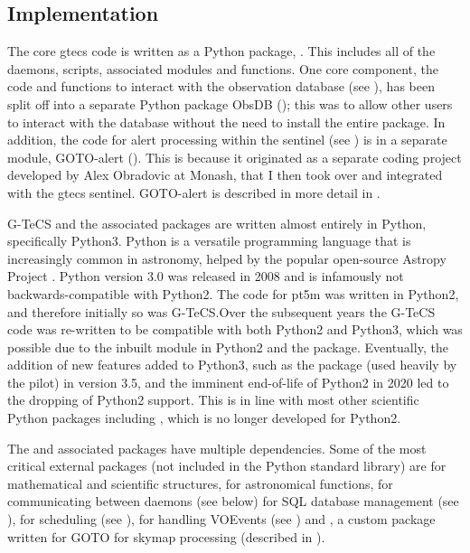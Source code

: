 \begin{colsection}
\begin{colsection}
\end{colsection}


\subsection{Implementation}
\label{sec:implementation}
\begin{colsection}

The core \gls{gtecs} code is written as a Python package, . This includes all of the daemons, scripts, associated modules and functions. One core component, the code and functions to interact with the observation database (see ), has been split off into a separate Python package ObsDB (); this was to allow other users to interact with the database without the need to install the entire  package. In addition, the code for alert processing within the sentinel (see ) is in a separate module, GOTO-alert (). This is because it originated as a separate coding project developed by Alex Obradovic at Monash, that I then took over and integrated with the \gls{gtecs} sentinel. GOTO-alert is described in more detail in .

G-TeCS and the associated packages are written almost entirely in Python, specifically Python3. Python is a versatile programming language that is increasingly common in astronomy, helped by the popular open-source Astropy Project \citep{astropy}. Python version 3.0 was released in 2008 and is infamously not backwards-compatible with Python2. The code for \gls{pt5m} was written in Python2, and therefore initially so was G-TeCS.\@ Over the subsequent years the G-TeCS code was re-written to be compatible with both Python2 and Python3, which was possible due to the inbuilt  module in Python2 and the  package. Eventually, the addition of new features added to Python3, such as the  package (used heavily by the pilot) in version 3.5, and the imminent end-of-life of Python2 in 2020 led to the dropping of Python2 support. This is in line with most other scientific Python packages including , which is no longer developed for Python2. %

The  and associated packages have multiple dependencies. Some of the most critical external packages (not included in the Python standard library) are  for mathematical and scientific structures,  for astronomical functions,  for communicating between daemons (see  below)  for SQL database management (see ),  for scheduling (see ),  for handling VOEvents (see ) and , a custom package written for GOTO for skymap processing (described in ).


\end{colsection}
\end{colsection}

